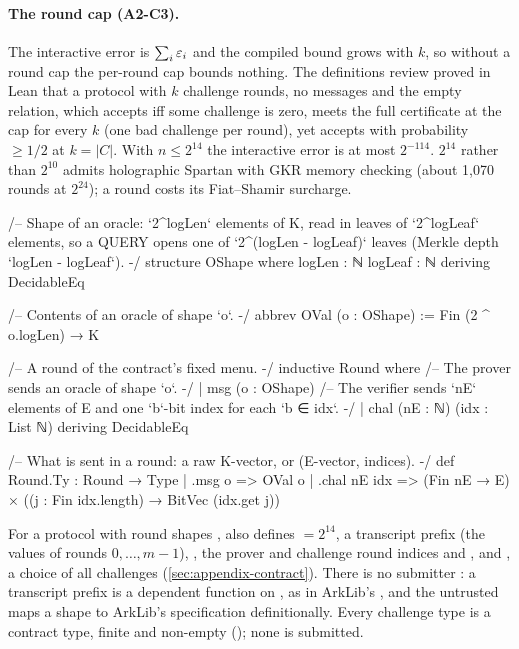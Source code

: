 \paragraph{The round cap (A2-C3).} The interactive error is $\sum_i\varepsilon_i$ and the compiled bound
grows with $k$, so without a round cap the per-round cap bounds nothing. The definitions review
proved in Lean that a protocol with $k$ challenge rounds, no messages and the empty relation, which
accepts iff some challenge is zero, meets the full certificate at the cap for every $k$ (one bad
challenge per round), yet accepts with probability $\ge 1/2$ at $k=|C|$. With $n\le2^{14}$ the
interactive error is at most $2^{-114}$. $2^{14}$ rather than $2^{10}$ admits holographic Spartan
with GKR memory checking (about 1,070 rounds at $2^{24}$); a round costs its Fiat--Shamir surcharge.

\begin{leancode}[fontsize=\footnotesize,label={\footnotesize Contract/Shapes.lean (abridged)}]
/-- Shape of an oracle: `2^logLen` elements of K, read in leaves of `2^logLeaf` elements, so a
QUERY opens one of `2^(logLen - logLeaf)` leaves (Merkle depth `logLen - logLeaf`). -/
structure OShape where
  logLen : ℕ
  logLeaf : ℕ
  deriving DecidableEq

/-- Contents of an oracle of shape `o`. -/
abbrev OVal (o : OShape) := Fin (2 ^ o.logLen) → K

/-- A round of the contract's fixed menu. -/
inductive Round where
  /-- The prover sends an oracle of shape `o`. -/
  | msg (o : OShape)
  /-- The verifier sends `nE` elements of E and one `b`-bit index for each `b ∈ idx`. -/
  | chal (nE : ℕ) (idx : List ℕ)
  deriving DecidableEq

/-- What is sent in a round: a raw K-vector, or (E-vector, indices). -/
def Round.Ty : Round → Type
  | .msg o => OVal o
  | .chal nE idx => (Fin nE → E) × ((j : Fin idx.length) → BitVec (idx.get j))
\end{leancode}
\noindent For a protocol with round shapes ,  also
defines  $=2^{14}$, a transcript prefix  (the values of rounds
$0,\dots,m-1$), , the prover and challenge round indices
 and , and , a choice of all
challenges (\cref{sec:appendix-contract}). There is no submitter : a transcript prefix is a dependent function
on , as in ArkLib's , and the untrusted
 maps a shape to ArkLib's specification definitionally. Every challenge
type is a contract type, finite and non-empty (); none is submitted.

